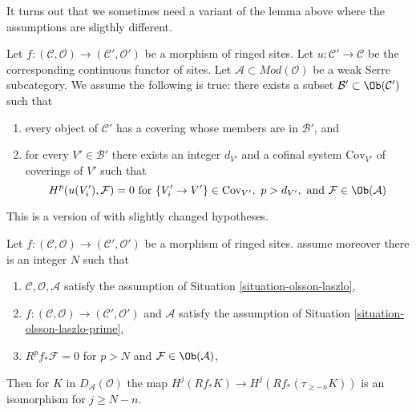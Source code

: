 \noindent
It turns out that we sometimes need a variant of the lemma above
where the assumptions are sligthly different.

\begin{situation}
\label{situation-olsson-laszlo-prime}
Let
$f : (\mathcal{C}, \mathcal{O}) \to (\mathcal{C}', \mathcal{O}')$
be a morphism of ringed sites. Let $u : \mathcal{C}' \to \mathcal{C}$
be the corresponding continuous functor of sites.
Let $\mathcal{A} \subset \textit{Mod}(\mathcal{O})$
be a weak Serre subcategory. We assume the following is true:
there exists a subset $\mathcal{B}' \subset \Ob(\mathcal{C}')$ such that
\begin{enumerate}
\item every object of $\mathcal{C}'$ has a covering whose
members are in $\mathcal{B}'$, and
\item for every $V' \in \mathcal{B}'$ there exists an integer $d_{V'}$
and a cofinal system $\text{Cov}_{V'}$ of coverings of $V'$ such
that
$$
H^p(u(V'_i), \mathcal{F}) = 0 \text{ for }
\{V'_i \to V'\} \in \text{Cov}_{V'},\ p > d_{V'}, \text{ and }
\mathcal{F} \in \Ob(\mathcal{A})
$$
\end{enumerate}
\end{situation}

\begin{lemma}
\label{lemma-olsson-laszlo-map-version-two}
\begin{reference}
This is a version of \cite[Lemma 2.1.10]{six-I} with slightly changed
hypotheses.
\end{reference}
Let $f : (\mathcal{C}, \mathcal{O}) \to (\mathcal{C}', \mathcal{O}')$
be a morphism of ringed sites.
assume moreover there is an integer $N$ such that
\begin{enumerate}
\item $\mathcal{C}, \mathcal{O}, \mathcal{A}$ satisfy the
assumption of Situation \ref{situation-olsson-laszlo},
\item $f : (\mathcal{C}, \mathcal{O}) \to (\mathcal{C}', \mathcal{O}')$
and $\mathcal{A}$ satisfy the assumption of
Situation \ref{situation-olsson-laszlo-prime},
\item $R^pf_*\mathcal{F} = 0$ for
$p > N$ and $\mathcal{F} \in \Ob(\mathcal{A})$,
\end{enumerate}
Then for $K$ in $D_\mathcal{A}(\mathcal{O})$ the map
$H^j(Rf_*K) \to H^j(Rf_*(\tau_{\geq -n}K))$ is an isomorphism
for $j \geq N - n$.
\end{lemma}

